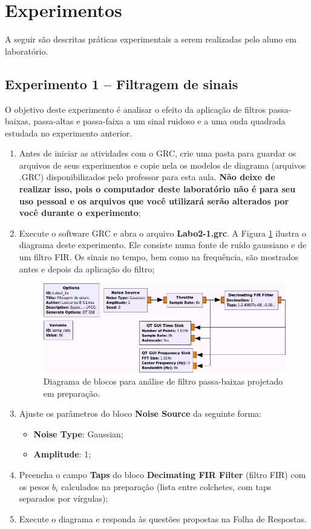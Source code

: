 \documentclass[12pt,addpoints]{exam}
\newcommand{\myscale}{0.4}
\begin{document}
\section{Experimentos}

A seguir são descritas práticas experimentais a serem realizadas pelo aluno em laboratório. 

\subsection{Experimento 1 -- Filtragem de sinais}

O objetivo deste experimento é analisar o efeito da aplicação de filtros passa-baixas, passa-altas e passa-faixa a um sinal ruidoso e a uma onda quadrada estudada no experimento anterior.

\begin{enumerate}
    \item Antes de iniciar as atividades com o GRC, crie uma pasta para guardar os arquivos de seus experimentos e copie nela os modelos de diagrama (arquivos .GRC) disponibilizados pelo professor para esta aula. \textbf{Não deixe de realizar isso, pois o computador deste laboratório não é para seu uso pessoal e os arquivos que você utilizará serão alterados por você durante o experimento};
    \item Execute o software GRC e abra o arquivo \textbf{Labo2-1.grc}. A Figura \ref{fig:GRC_2-1} ilustra o diagrama deste experimento. Ele consiste numa fonte de ruído gaussiano e de um filtro FIR. Os sinais no tempo, bem como na frequência, são mostrados antes e depois da aplicação do filtro;
    \begin{figure}[htb]
        \centering
        \includegraphics[scale=\myscale]{./Figuras/GRC_2-1}
        \caption{Diagrama de blocos para análise de filtro passa-baixas projetado em preparação.} 
        \label{fig:GRC_2-1}
    \end{figure}
    \item Ajuste os parâmetros do bloco \textbf{Noise Source} da seguinte forma:
    \begin{itemize}
        \item \textbf{Noise Type}: Gaussian;
        \item \textbf{Amplitude}: 1;
    \end{itemize}
    \item Preencha o campo \textbf{Taps} do bloco \textbf{Decimating FIR Filter} (filtro FIR) com os pesos $b_i$ calculados na preparação (lista entre colchetes, com taps separados por vírgulas);
    \item Execute o diagrama e responda às questões propostas na Folha de Respostas.
\end{enumerate}
\end{document}
